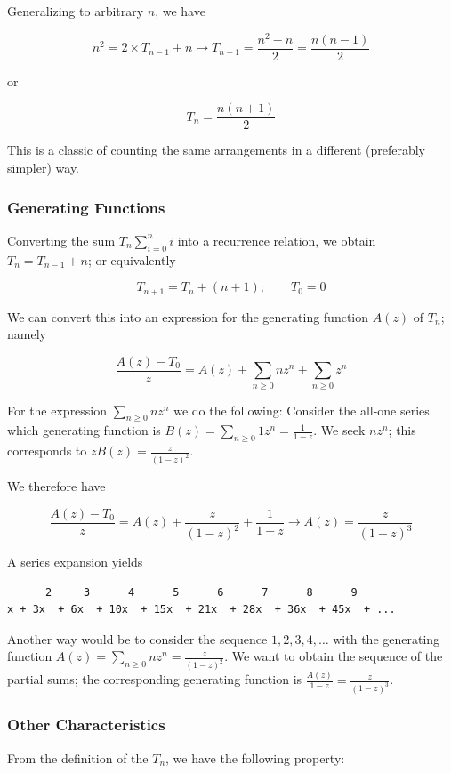 Generalizing to arbitrary $n$, we have

\[n^2 = 2 \times T_{n-1} + n \rightarrow T_{n-1} = \frac{n^2 - n}{2} = \frac{n(n-1)}{2} \]

or

\[T_{n} = \frac{n(n+1)}{2}\]

This is a classic of counting the same arrangements in a different
(preferably simpler) way.

\subsubsection{Generating Functions}

Converting the sum $T_n \sum_{i=0}^n i$ into a recurrence relation, we obtain $T_n = T_{n-1} + n$; or equivalently

\[ T_{n+1} = T_n + (n+1); \qquad T_0 = 0\]

We can convert this into an expression for the generating function
$A(z)$ of $T_n$; namely

\[ \frac{A(z)-T_0}{z} = A(z) + \sum_{n \geq 0}n z^n + \sum_{n \geq 0} z^n \]

For the expression $\sum_{n \geq 0}n z^n$ we do the following: Consider the all-one series which generating function is $B(z) = \sum_{n \geq 0} 1 z^n = \frac{1}{1-z}$. We seek $n z^n$; this corresponds to $z B(z) = \frac{z}{(1-z)^2}$.

We therefore have

\[ \frac{A(z)-T_0}{z} = A(z) + \frac{z}{(1-z)^2} + \frac{1}{1-z} \rightarrow A(z) = \frac{z}{(1-z)^3}\]

A series expansion yields

\begin{verbatim}
      2     3      4      5      6      7      8      9
x + 3x  + 6x  + 10x  + 15x  + 21x  + 28x  + 36x  + 45x  + ...
\end{verbatim}

Another way would be to consider the sequence $1,2,3,4,\ldots$ with the generating function $A(z) = \sum_{n \geq 0} n z^n = \frac{z}{(1-z)^2}$. We want to obtain the sequence of the partial sums; the corresponding generating function is $\frac{A(z)}{1-z} = \frac{z}{(1-z)^3}$.

\subsubsection{Other Characteristics}

From the definition of the $T_n$, we have the following property:

